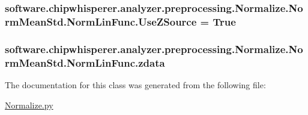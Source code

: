 \subsubsection[{Use\+Z\+Source}]{\setlength{\rightskip}{0pt plus 5cm}software.\+chipwhisperer.\+analyzer.\+preprocessing.\+Normalize.\+Norm\+Mean\+Std.\+Norm\+Lin\+Func.\+Use\+Z\+Source = True\hspace{0.3cm}{\ttfamily [static]}}\label{classsoftware_1_1chipwhisperer_1_1analyzer_1_1preprocessing_1_1Normalize_1_1NormMeanStd_1_1NormLinFunc_a85e74de629bb70f21dddfc8ea0bf7df9}
\hypertarget{classsoftware_1_1chipwhisperer_1_1analyzer_1_1preprocessing_1_1Normalize_1_1NormMeanStd_1_1NormLinFunc_a8ed7284f54917cc2c656e074114f37b8}{}
\subsubsection[{zdata}]{\setlength{\rightskip}{0pt plus 5cm}software.\+chipwhisperer.\+analyzer.\+preprocessing.\+Normalize.\+Norm\+Mean\+Std.\+Norm\+Lin\+Func.\+zdata}\label{classsoftware_1_1chipwhisperer_1_1analyzer_1_1preprocessing_1_1Normalize_1_1NormMeanStd_1_1NormLinFunc_a8ed7284f54917cc2c656e074114f37b8}


The documentation for this class was generated from the following file\+:\begin{DoxyCompactItemize}
\item 
\hyperlink{Normalize_8py}{Normalize.\+py}\end{DoxyCompactItemize}
